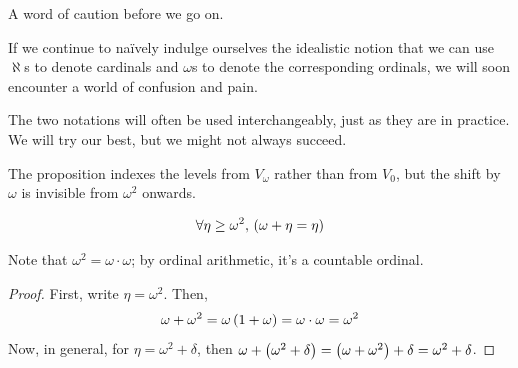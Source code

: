 A word of caution before we go on.

\begin{boxwarning}
    If we continue to naïvely indulge ourselves the idealistic notion that we can use $\aleph$s to denote cardinals and $\omega$s to denote the corresponding ordinals, we will soon encounter a world of confusion and pain.

    The two notations will often be used interchangeably, just as they are in practice. We will try our best, but we might not always succeed.
\end{boxwarning}

The proposition indexes the levels from $V_{\omega}$ rather than from $V_0$, but the shift by $\omega$ is invisible from $\omega^2$ onwards.

\begin{boxproposition}[without AC]
    \begin{align*}
        \forall \eta \geq \omega^2, \, \left( \omega + \eta = \eta \right)
    \end{align*}
\end{boxproposition}
Note that $\omega^2 = \omega \cdot \omega$; by ordinal arithmetic, it's a countable ordinal.
\begin{proof}
    First, write $\eta = \omega^2$. Then,
    \begin{align*}
        \omega + \omega^2 = \omega\left( 1 + \omega \right) = \omega \cdot \omega = \omega^2
    \end{align*}
    Now, in general, for $\eta = \omega^2 + \delta$, then $\omega + \left( \omega^2 + \delta \right) = \left( \omega + \omega^2 \right) + \delta = \omega^2 + \delta$.
\end{proof}
